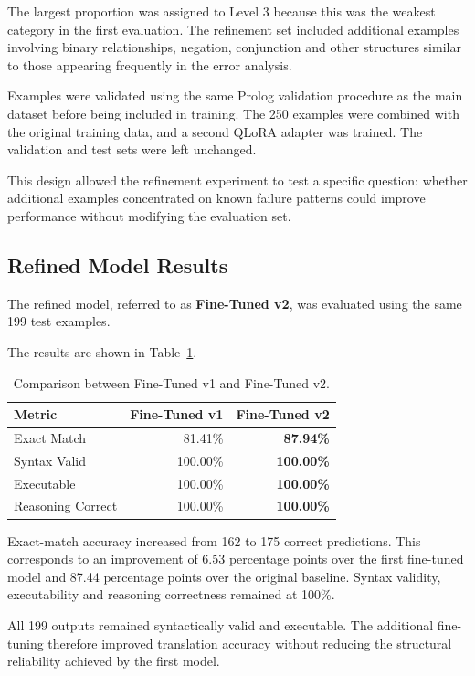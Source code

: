 \documentclass[11pt]{article} %
\theoremstyle{plain}
\theoremstyle{definition}
\begin{document}
The largest proportion was assigned to Level 3 because this was the weakest
category in the first evaluation. The refinement set included additional
examples involving binary relationships, negation, conjunction and other
structures similar to those appearing frequently in the error analysis.

Examples were validated using the same Prolog validation procedure as the main
dataset before being included in training. The 250 examples were combined with
the original training data, and a second QLoRA adapter was trained. The
validation and test sets were left unchanged.

This design allowed the refinement experiment to test a specific question:
whether additional examples concentrated on known failure patterns could
improve performance without modifying the evaluation set.


\subsection{Refined Model Results}

The refined model, referred to as \textbf{Fine-Tuned v2}, was evaluated using
the same 199 test examples.

The results are shown in Table~\ref{tab:v2-results}.

\begin{table}[ht]
\centering
\caption{Comparison between Fine-Tuned v1 and Fine-Tuned v2.}
\label{tab:v2-results}
\begin{tabular}{lrr}
\toprule
\textbf{Metric} & \textbf{Fine-Tuned v1} & \textbf{Fine-Tuned v2} \\
\midrule
Exact Match       & 81.41\%  & \textbf{87.94\%}  \\
Syntax Valid      & 100.00\% & \textbf{100.00\%} \\
Executable        & 100.00\% & \textbf{100.00\%} \\
Reasoning Correct & 100.00\%  & \textbf{100.00\%} \\
\bottomrule
\end{tabular}
\end{table}

Exact-match accuracy increased from 162 to 175 correct predictions. This
corresponds to an improvement of 6.53 percentage points over the first
fine-tuned model and 87.44 percentage points over the original baseline.
Syntax validity, executability and reasoning correctness remained at 100\%.

All 199 outputs remained syntactically valid and executable. The additional
fine-tuning therefore improved translation accuracy without reducing the
structural reliability achieved by the first model.
\end{document}
